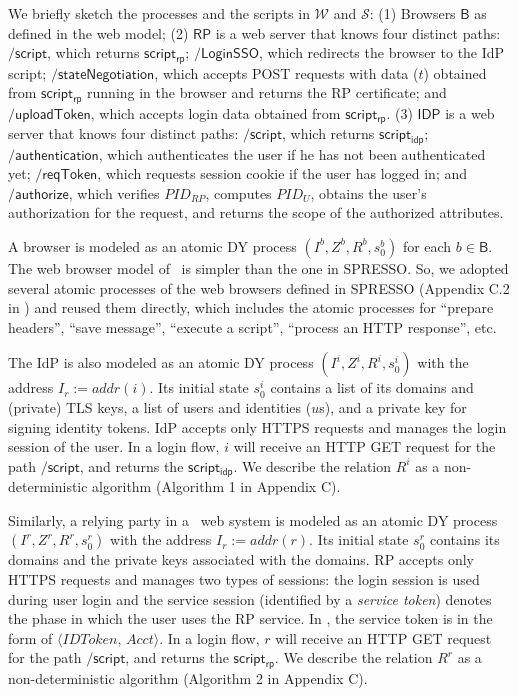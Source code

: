 We briefly sketch the processes and the scripts in $\mathcal{W}$ and $\mathcal{S}$: 
(1) Browsers $\mathsf{B}$ as defined in the web model; 
(2) $\mathsf{RP}$ is a web server that knows four distinct paths: $\mathsf{/script}$, which returns $\mathsf{script_{rp}}$; $\mathsf{/LoginSSO}$, which redirects the browser to the IdP script; $\mathsf{/stateNegotiation}$, which accepts POST requests with data ($t$) obtained from $\mathsf{script_{rp}}$ running in the browser and returns the RP certificate; and $\mathsf{/uploadToken}$, which accepts login data obtained from $\mathsf{script_{rp}}$. 
(3) $\mathsf{IDP}$ is a web server that knows four distinct paths: $\mathsf{/script}$, which returns $\mathsf{script_{idp}}$; $\mathsf{/authentication}$, which authenticates the user if he has not been authenticated yet; $\mathsf{/reqToken}$, which requests session cookie if the user has logged in; and $\mathsf{/authorize}$, which verifies $PID_{RP}$, computes $PID_U$, obtains the user's authorization for the request, and returns the scope of the authorized attributes. %

A browser is modeled as an atomic DY process $(I^b, Z^b, R^b, s_0^b)$ for each $b \in \mathsf{B}$. The web browser model of \usso\ is simpler than the one in SPRESSO. So, we adopted several atomic processes of the web browsers defined in SPRESSO (Appendix C.2 in \cite{SPRESSO}) and reused them directly, which includes the atomic processes for ``prepare headers'', ``save message'', ``execute a script'', ``process an HTTP response'', etc. 

The IdP is also modeled as an atomic DY process $(I^i, Z^i, R^i, s_0^i)$ with the address $I_r:=addr(i)$. Its initial state $s_0^i$ contains a list of its domains and (private) TLS keys, a list of users and identities ($u$s), and a private key
for signing identity tokens. IdP accepts only HTTPS requests and manages the login session of the user. In a login flow, $i$ will receive an HTTP GET request for the path $\mathsf{/script}$, and returns the $\mathsf{script_{idp}}$. We describe the relation $R^i$ as a non-deterministic algorithm (Algorithm 1 in Appendix C). 

Similarly, a relying party in a \usso\ web system is modeled as an atomic DY process $(I^r, Z^r, R^r, s_0^r)$ with the address $I_r:=addr(r)$. Its initial state $s_0^r$ contains its domains and the private keys associated with the domains. RP accepts only HTTPS requests and manages two types of sessions: the login session is used during user login and the service session (identified by a {\em service token}) denotes the phase in which the user uses the RP service. In \usso, the service token is in the form of $\langle IDToken$, $Acct \rangle$. In a login flow, $r$ will receive an HTTP GET request for the path $\mathsf{/script}$, and returns the $\mathsf{script_{rp}}$. We describe the relation $R^r$ as a non-deterministic algorithm (Algorithm 2 in Appendix C). 


